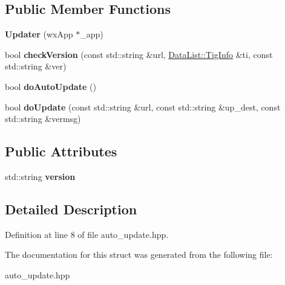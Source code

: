 \subsection*{Public Member Functions}
\begin{DoxyCompactItemize}
\item 
\hypertarget{struct_updater_ade31bebff72229b5800d285efdd19827}{{\bfseries Updater} (wx\-App $\ast$\-\_\-app)}\label{struct_updater_ade31bebff72229b5800d285efdd19827}

\item 
\hypertarget{struct_updater_ac75f04a645b62e96c9ff7414f9940fcb}{bool {\bfseries check\-Version} (const std\-::string \&url, \hyperlink{struct_data_list_1_1_tig_info}{Data\-List\-::\-Tig\-Info} \&ti, const std\-::string \&ver)}\label{struct_updater_ac75f04a645b62e96c9ff7414f9940fcb}

\item 
\hypertarget{struct_updater_afc377b7fd896168d89252cafbcd405f9}{bool {\bfseries do\-Auto\-Update} ()}\label{struct_updater_afc377b7fd896168d89252cafbcd405f9}

\item 
\hypertarget{struct_updater_a4f1e4bdd6189f9fb62e167e5b2c2da64}{bool {\bfseries do\-Update} (const std\-::string \&url, const std\-::string \&up\-\_\-dest, const std\-::string \&vermsg)}\label{struct_updater_a4f1e4bdd6189f9fb62e167e5b2c2da64}

\end{DoxyCompactItemize}
\subsection*{Public Attributes}
\begin{DoxyCompactItemize}
\item 
\hypertarget{struct_updater_a71ce18699f5ae41809ceabc89ad79dc4}{std\-::string {\bfseries version}}\label{struct_updater_a71ce18699f5ae41809ceabc89ad79dc4}

\end{DoxyCompactItemize}


\subsection{Detailed Description}


Definition at line 8 of file auto\-\_\-update.\-hpp.



The documentation for this struct was generated from the following file\-:\begin{DoxyCompactItemize}
\item 
auto\-\_\-update.\-hpp\end{DoxyCompactItemize}

